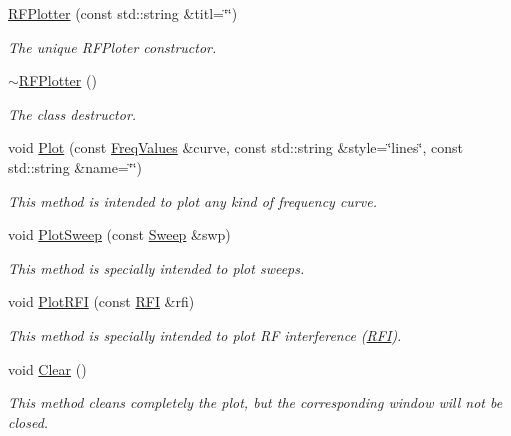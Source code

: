 \begin{DoxyCompactItemize}
\item 
\hyperlink{classRFPlotter_af6924d7315d5c41390be12c329566579}{R\+F\+Plotter} (const std\+::string \&titl=\char`\"{}\char`\"{})
\begin{DoxyCompactList}\small\item\em The unique {\itshape R\+F\+Ploter} constructor. \end{DoxyCompactList}\item 
\hyperlink{classRFPlotter_aa69fbeac640e9f9ee545dbe2f1e3b3d7}{$\sim$\+R\+F\+Plotter} ()
\begin{DoxyCompactList}\small\item\em The class destructor. \end{DoxyCompactList}\item 
void \hyperlink{classRFPlotter_a18d4b13f13b2b1ac9fd9f011ac101303}{Plot} (const \hyperlink{structFreqValues}{Freq\+Values} \&curve, const std\+::string \&style=\char`\"{}lines\char`\"{}, const std\+::string \&name=\char`\"{}\char`\"{})
\begin{DoxyCompactList}\small\item\em This method is intended to plot any kind of frequency curve. \end{DoxyCompactList}\item 
void \hyperlink{classRFPlotter_a0e70ff9d46ed3edef45529f97753490f}{Plot\+Sweep} (const \hyperlink{structSweep}{Sweep} \&swp)
\begin{DoxyCompactList}\small\item\em This method is specially intended to plot sweeps. \end{DoxyCompactList}\item 
void \hyperlink{classRFPlotter_a85da775645cb7beae79dfbdeab45f272}{Plot\+R\+FI} (const \hyperlink{structRFI}{R\+FI} \&rfi)
\begin{DoxyCompactList}\small\item\em This method is specially intended to plot RF interference (\hyperlink{structRFI}{R\+FI}). \end{DoxyCompactList}\item 
\mbox{\label{classRFPlotter_ad91ddf62a91703da39441995c0bc8330}} 
void \hyperlink{classRFPlotter_ad91ddf62a91703da39441995c0bc8330}{Clear} ()
\begin{DoxyCompactList}\small\item\em This method cleans completely the plot, but the corresponding window will not be closed. \end{DoxyCompactList}\end{DoxyCompactItemize}


